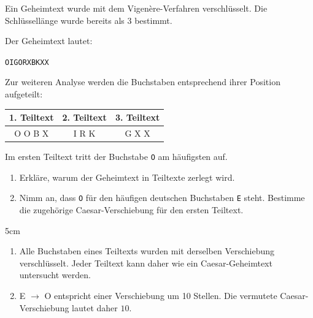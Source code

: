\question[5]
Ein Geheimtext wurde mit dem Vigenère-Verfahren verschlüsselt.
Die Schlüssellänge wurde bereits als $3$ bestimmt.

Der Geheimtext lautet:

\begin{center}
\texttt{OIGORXBKXX}
\end{center}

Zur weiteren Analyse werden die Buchstaben entsprechend ihrer Position aufgeteilt:

\begin{center}
\begin{tabular}{|c|c|c|}
\hline
1. Teiltext & 2. Teiltext & 3. Teiltext \\
\hline
O O B X & I R K & G X X \\
\hline
\end{tabular}
\end{center}

Im ersten Teiltext tritt der Buchstabe \texttt{O} am häufigsten auf.

\begin{enumerate}[label=\alph*)]
\item Erkläre, warum der Geheimtext in Teiltexte zerlegt wird.
\item Nimm an, dass \texttt{O} für den häufigen deutschen Buchstaben \texttt{E} steht. Bestimme die zugehörige Caesar-Verschiebung für den ersten Teiltext.
\end{enumerate}

\begin{solutionbox}{5cm}
\begin{enumerate}[label=\alph*)]
\item Alle Buchstaben eines Teiltexts wurden mit derselben Verschiebung verschlüsselt. Jeder Teiltext kann daher wie ein Caesar-Geheimtext untersucht werden.
\item E $\rightarrow$ O entspricht einer Verschiebung um 10 Stellen.
Die vermutete Caesar-Verschiebung lautet daher $10$.
\end{enumerate}
\end{solutionbox}